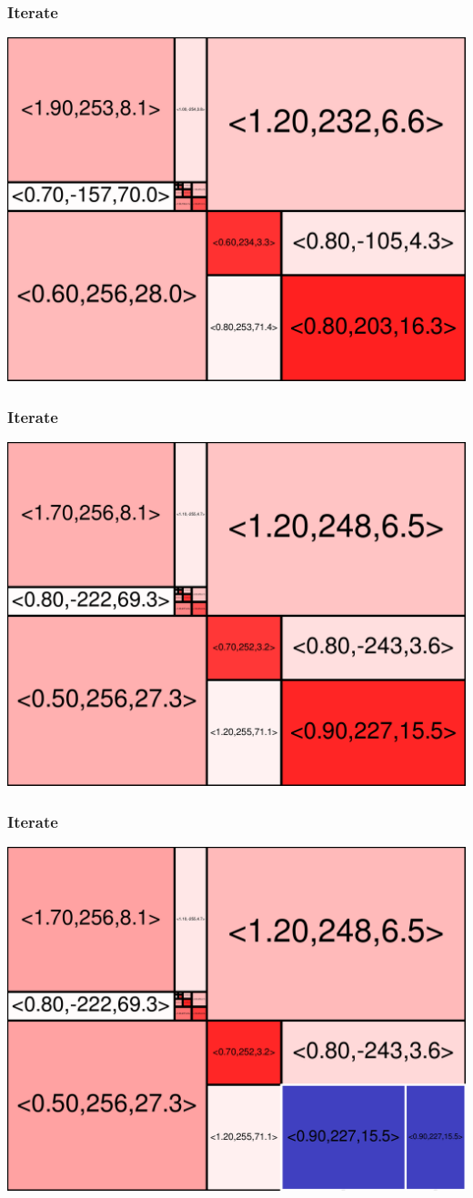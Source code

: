 \begin{frame}
\frametitle{Iterate}\begin{centering}\includegraphics[width=8.5 cm]{remy-graph/graph/test18.pdf}

\end{centering}\end{frame}


\begin{frame}
\frametitle{Iterate}\begin{centering}\includegraphics[width=8.5 cm]{remy-graph/graph/test19.pdf}

\end{centering}\end{frame}


\begin{frame}
\frametitle{Iterate}\begin{centering}\includegraphics[width=8.5 cm]{remy-graph/graph/test20.pdf}

\end{centering}\end{frame}


